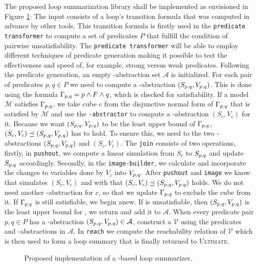 
The proposed \qvasrs loop summarization library shall be implemented as envisioned in Figure \ref{fig}: The input consists of a loop's transition formula that was computed in advance by other tools. This transition formula is firstly used in the \texttt{predicate transformer} to compute a set of predicates $P$ that fulfill the condition of pairwise unsatisfiability. The \texttt{predicate transformer} will be able to employ different techniques of predicate generation making it possible to test the effectiveness and speed of, for example, strong versus weak predicates. Following the predicate generation, an empty \qvasr-abstraction set $\mathcal{A}$ is initialized. For each pair of predicates $p, q \in P$ we need to compute a \qvasr-abstraction $(S_{p, q}, V_{p, q})$. This is done using the formula $\Gamma_{p, q} = p \land F \land q$, which is checked for satisfiability. If a model $\mathcal{M}$ satisfies $\Gamma_{p, q}$, we take cube $c$ from the disjunctive normal form of $\Gamma_{p, q}$ that is satisfied by $\mathcal{M}$ and use the \texttt{\qvasr-abstractor} to compute a \qvasr-abstraction $(S_c, V_c)$ for it. Because we want $(S_{p, q}, V_{p, q})$ to be the least upper bound of $\Gamma_{p, q}$, $(S_c, V_c) \preceq (S_{p, q}, V_{p, q})$ has to hold. To ensure this, we need to  the two \qvasr-abstractions $(S_{p, q}, V_{p, q})$ and $(S_c, V_c)$. The \texttt{join} consists of two operations, firstly, in \texttt{pushout}, we compute a linear simulation from $S_c$ to $S_{p, q}$ and update $S_{p, q}$ accordingly. Secondly, in the \texttt{image-builder}, we calculate and incorporate the changes to variables done by $V_c$ into $V_{p, q}$. After \texttt{pushout} and \texttt{image} we know that \pqvasr simulates $(S_c, V_c)$ and with that $(S_c, V_c) \preceq (S_{p, q}, V_{p, q})$ holds. We do not need another \qvasr-abstraction for $c$, so that we update $\Gamma_{p, q}$ to exclude the cube from it. If $\Gamma_{p, q}$ is still satisfiable, we begin anew.
If \pqformula is unsatisfiable, then $(S_{p, q}, V_{p, q})$ is the least upper bound for \pqformula, we return and add it to $\mathcal{A}$. When every predicate pair $p, q \in P$ has a \qvasr-abstraction $(S_{p, q}, V_{p, q}) \in \mathcal{A}$, construct a \qvasrs $\mathcal{V}$ using the predicates and \qvasr-abstractions in $\mathcal{A}$. In \texttt{reach} we compute the reachability relation of $\mathcal{V}$ which is then used to form a loop summary that is finally returned to \textsc{Ultimate}.
\begin{figure}[H]
    
    \caption{Proposed implementation of a \qvasrs-based loop summarizer.}
    \label{fig}
\end{figure}

